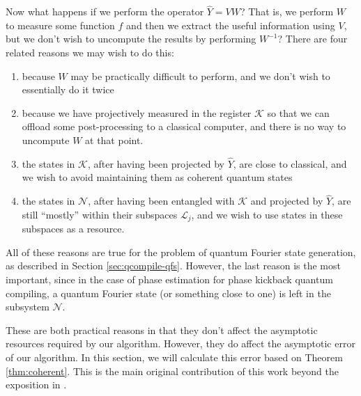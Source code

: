 Now what happens if we perform the operator $\hat{Y} = VW$? That is, we
perform $W$ to measure some function $f$ and then we extract the useful
information using $V$, but we don't wish to uncompute the results by
performing $W^{-1}$? There are four related reasons we may wish to do this:

\begin{enumerate}
\item
because $W$ may be practically difficult to perform, and we don't wish
to essentially do it twice
\item
because we have projectively measured
in the register $\mathcal{K}$ so that we can offload some post-processing to
a classical computer, and there is no way to uncompute $W$ at that point.
\item
the states in $\mathcal{K}$, after having been projected by $\hat{Y}$,
are close to classical, and we wish to avoid maintaining them as coherent
quantum states
\item
the states in $\mathcal{N}$, after having been entangled with $\mathcal{K}$ and
projected by $\hat{Y}$, are still ``mostly'' within their subspaces
$\mathcal{L}_j$, and we wish to use states in these subspaces as a resource.
\end{enumerate}

All of these reasons are true for the problem of quantum Fourier state
generation, as described in Section \ref{sec:qcompile-qfs}. However,
the last reason is the most important, since in the case of phase
estimation for phase kickback quantum compiling, a quantum Fourier
state (or something close to one) is left in the subsystem $\mathcal{N}$.

These are both practical reasons in that they don't affect the
asymptotic resources required by our algorithm. However, they do affect
the asymptotic error of our algorithm. In this section, we will calculate
this error based on Theorem \ref{thm:coherent}. This is the main original
contribution of this work beyond the exposition in \cite{Kitaev2002}.

